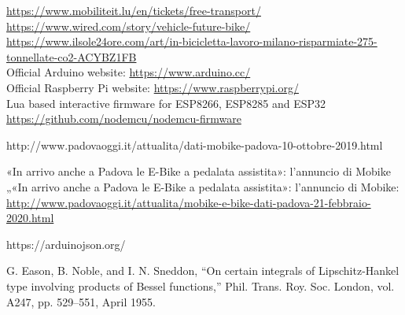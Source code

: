 \begin{thebibliography}{00}
	
 \url{https://www.mobiliteit.lu/en/tickets/free-transport/}\\

 \url{https://www.wired.com/story/vehicle-future-bike/}\\

  \href{https://www.ilsole24ore.com/art/in-bicicletta-lavoro-milano-risparmiate-275-tonnellate-co2-ACYBZ1FB}{https://www.ilsole24ore.com/art/in-bicicletta-lavoro-milano-risparmiate-275-tonnellate-co2-ACYBZ1FB}\\

 Official Arduino website: \url{https://www.arduino.cc/}\\

 Official Raspberry Pi website: \url{https://www.raspberrypi.org/}\\
	
 Lua based interactive firmware for ESP8266, ESP8285 and ESP32 \url{https://github.com/nodemcu/nodemcu-firmware}

http://www.padovaoggi.it/attualita/dati-mobike-padova-10-ottobre-2019.html

 «In arrivo anche a Padova le E-Bike a pedalata assistita»: l'annuncio di Mobike
„«In arrivo anche a Padova le E-Bike a pedalata assistita»: l'annuncio di Mobike:  \href{http://www.padovaoggi.it/attualita/mobike-e-bike-dati-padova-21-febbraio-2020.html}{http://www.padovaoggi.it/attualita/mobike-e-bike-dati-padova-21-febbraio-2020.html}

https://arduinojson.org/
	
 G. Eason, B. Noble, and I. N. Sneddon, ``On certain integrals of Lipschitz-Hankel type involving products of Bessel functions,'' Phil. Trans. Roy. Soc. London, vol. A247, pp. 529--551, April 1955.
\end{thebibliography}
